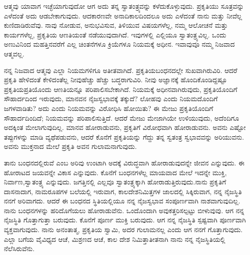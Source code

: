 ಆತ್ಮವು ಯಾವಾಗ ಇಚ್ಛೆಯಾಗುವುದೋ ಆಗ ಅದು ತನ್ನ ಸ್ವಾತಂತ್ರ್ಯವನ್ನು ಕಳೆದುಕೊಳ್ಳುವುದು. ಪ್ರಕೃತಿಯು ಸೂತ್ರವನ್ನು ಎಳೆದಂತೆ ಅದು ಆಡಬೇಕಾಗುವುದು. ಆದಕಾರಣವೇ ಅನಾದಿಕಾಲದಿಂದಲೂ ಅದು ಎಳೆದಂತೆ ನಾನು ಮತ್ತು ನೀವೆಲ್ಲ ಕುಣಿದಾಡಿರುವೆವು. ನಾವು ನೋಡುವ, ಅನುಭವಿಸುವ, ತಿಳಿಯುವ ವಿಷಯಗಳೆಲ್ಲ, ನಮ್ಮ ಆಲೋಚನೆ ಮತ್ತು ಕಾರ್ಯಗಳೆಲ್ಲ, ಪ್ರಕೃತಿಯ ಆಣತಿಯಂತೆ ನಡೆಯುವುದಾಗಿದೆ. ಇವುಗಳಲ್ಲಿ ಎಲ್ಲಿಯೂ ಸ್ವಾತಂತ್ರ್ಯವಿಲ್ಲ. ಒಂದು ಅಣುವಿನಿಂದ ಮಹತ್ತಿನವರೆಗೆ ಎಲ್ಲ ಚಿಂತನೆಗಳೂ ಕ್ರಿಯೆಗಳೂ ನಿಯಮಕ್ಕೆ ಅಧೀನ. ಇವಾವುವೂ ನಮ್ಮ ನಿಜವಾದ ಆತ್ಮವಲ್ಲ.

ನನ್ನ ನಿಜವಾದ ಆತ್ಮವು ಎಲ್ಲಾ ನಿಯಮಗಳಿಗೂ ಅತೀತವಾಗಿದೆ. ಪ್ರಕೃತಿಯ\break ಬಂಧನದಲ್ಲೇ ಸುಖವಾಗಿರುವಿರಿ. ಆದರೆ ಪ್ರಕೃತಿ ಹೇಳಿದಂತೆ ಕೇಳಿದಂತೆಲ್ಲ ನೀವು\break ಹೆಚ್ಚು ಹೆಚ್ಚು ಬದ್ಧರಾಗುವಿರಿ. ನೀವು ಅಜ್ಞಾನಕ್ಕೆ ಹೊಂದಿಕೊಂಡಿದ್ದಷ್ಟೂ ಪ್ರಕೃತಿಯ\break ಪ್ರತಿಯೊಂದು ಆಣತಿಯನ್ನೂ ಪರಿಪಾಲಿಸಬೇಕಾಗಿದೆ. ನಿಯಮಕ್ಕೆ ಅಧೀನವಾಗಿರುವುದು, ಪ್ರಕೃತಿಯೊಂದಿಗೆ ಸೌಹಾರ್ದದಿಂದ ಇರುವುದು, ಮಾನವನ ನೈಜಸ್ವಭಾವಕ್ಕೆ ತಕ್ಕುದೆ? ಲೋಹವು ಎಂದು ನಿಯಮದೊಂದಿಗೆ ಜಗಳವಾಡಿತು? ಅದು ಎಂದು ನಿಯಮವನ್ನು ವಿರೋಧಿಸಿ ಹೋಯಿತು? ಈ ಮೇಜು ಪ್ರಕೃತಿಯೊಂದಿಗೆ ಸೌಹಾರ್ದದಿಂದಿದೆ; ನಿಯಮವನ್ನು ಪರಿಪಾಲಿಸುತ್ತಿದೆ. ಆದರೆ ಮೇಜು ಮೇಜಾಗಿಯೇ ಉಳಿಯುವುದು, ಅದೆಂದಿಗೂ ಅದಕ್ಕಿಂತ ಮೇಲಾಗುವುದಿಲ್ಲ. ಮಾನವ ಹೋರಾಡುವನು, ಪ್ರಕೃತಿಗೆ ವಿರೋಧವಾಗಿ ಹೋರಾಡುವನು. ಅವನು ಎಷ್ಟೋ ತಪ್ಪುಗಳನ್ನು ಮಾಡಿ ವ್ಯಥೆಪಡುವನು, ಆದರೆ ಕೊನೆಗೆ ಪ್ರಕೃತಿಯನ್ನು ಗೆದ್ದು ತನ್ನ ಸ್ವತಂತ್ರ ಸ್ವಭಾವವನ್ನು ಅರಿಯುವನು. ಅವನು ಮುಕ್ತನಾದ ಮೇಲೆ ಪ್ರಕೃತಿ ಅವನ ಗುಲಾಮನಾಗುವುದು.

ತಾನು ಬಂಧನದಲ್ಲಿರುವೆ ಎಂಬ ಅರಿವು ಉಂಟಾಗಿ ಅದಕ್ಕೆ ವಿರುದ್ಧವಾಗಿ ಹೋರಾಡುವುದನ್ನೇ ಜೀವನ ಎನ್ನುವುದು. ಈ ಹೋರಾಟದ ಜಯವನ್ನೇ ವಿಕಾಸ  ಎನ್ನುವುದು. ಕೊನೆಗೆ ಬಂಧನಗಳೆಲ್ಲ ಮಾಯವಾದ ಮೇಲೆ ಇದನ್ನೇ ಮುಕ್ತಿ, ನಿರ್ವಾಣ,\break ಸ್ವಾತಂತ್ರ್ಯ ಎನ್ನುವುದು. ಜಗತ್ತಿನಲ್ಲಿ ಎಲ್ಲವೂ ಸ್ವಾತಂತ್ರ್ಯಕ್ಕಾಗಿ ಹೋರಾಡುತ್ತಿರುವುದು.\break ನಾನು ಪ್ರಕೃತಿಗೆ ದಾಸನಾದಾಗ, ನಾಮರೂಪಗಳ ಬಲೆಯಲ್ಲಿ ಇರುವಾಗ, ಕಾಲದೇಶನಿಮಿತ್ತಗಳ ಜಾಲದಲ್ಲಿ ಸಿಕ್ಕಿರುವಾಗ, ನನ್ನ ನೈಜಸ್ಥಿತಿ ನನಗೆ ಅರಿವಾಗದು. ಆದರೆ ಈ ಬಂಧನದ ಸ್ಥಿತಿಯಲ್ಲಿಯೂ ನನ್ನ ನೈಜಸ್ವಭಾವ ಸಂಪೂರ್ಣವಾಗಿ ನಾಶವಾಗುವುದಿಲ್ಲ. ನಾನು ಬಂಧನಗಳನ್ನು ಹರಿದೊಗೆಯಲು ಹೋರಾಡುವೆನು. ಒಂದೊಂದಾಗಿ ಅವು\break ಕತ್ತರಿಸಲ್ಪಟ್ಟು ಬೀಳುವುವು. ಆಗ ನನ್ನ ನೈಜಸ್ಥಿತಿ ಗೊತ್ತಾಗುತ್ತಾ ಬರುವುದು. ಕೊನೆಗೆ ಪೂರ್ಣ ಮುಕ್ತಿ ಬರುವುದು. ಆಗ ನನ್ನ ನೈಜಸ್ಥಿತಿ ಸ್ಪಷ್ಟವಾಗಿ ಪೂರ್ಣವಾಗಿ ವ್ಯಕ್ತವಾಗುವುದು. ನಾನು ಅನಂತಾತ್ಮ, ಪ್ರಕೃತಿಯ ಸ್ವಾಮಿ, ಅದರ ಗುಲಾಮನಲ್ಲ ಎಂದು ಆಗ ನನಗೆ ಗೊತ್ತಾಗುವುದು. ಎಲ್ಲಾ ಬಗೆಯ ವೈವಿಧ್ಯದ ಆಚೆ, ಮಿಶ್ರಣದ ಆಚೆ, ಕಾಲ ದೇಶ ನಿಮಿತ್ತಾತೀತನಾಗಿ ನಾನು ನನ್ನ ನೈಜಸ್ಥಿತಿಯಲ್ಲಿ ನೆಲೆಸಿರುವೆನು.

